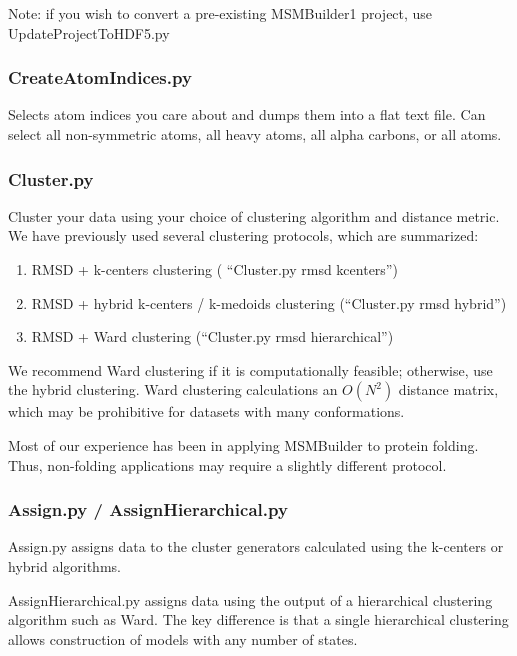 \documentclass[12pt]{article}
\begin{document}
Note: if you wish to convert a pre-existing MSMBuilder1 project, use UpdateProjectToHDF5.py 

\subsubsection{CreateAtomIndices.py}
Selects atom indices you care about and dumps them into a flat text file. Can select all non-symmetric atoms, all heavy atoms, all alpha carbons, or all atoms.

\subsubsection{Cluster.py}

Cluster your data using your choice of clustering algorithm and distance metric.  We have previously used several clustering protocols, which are summarized:

\begin{enumerate}
 \item RMSD + k-centers clustering \cite{Bowman2009c, Bowman2009a} ( ``Cluster.py  rmsd kcenters'')
 \item RMSD + hybrid k-centers / k-medoids clustering \cite{msmb2} (``Cluster.py  rmsd hybrid'')
 \item RMSD + Ward clustering (``Cluster.py  rmsd hierarchical'')
\end{enumerate}

We recommend Ward clustering if it is computationally feasible; otherwise, use the hybrid clustering.  Ward clustering calculations an $O(N^2)$ distance matrix, which may be prohibitive for datasets with many conformations.  

Most of our experience has been in applying MSMBuilder to protein folding.  Thus, non-folding applications may require a slightly different protocol.

\subsubsection{Assign.py / AssignHierarchical.py}
Assign.py assigns data to the cluster generators calculated using the k-centers or hybrid algorithms.

AssignHierarchical.py assigns data using the output of a hierarchical clustering algorithm such as Ward.  The key difference is that a single hierarchical clustering allows construction of models with any number of states.
\end{document}
